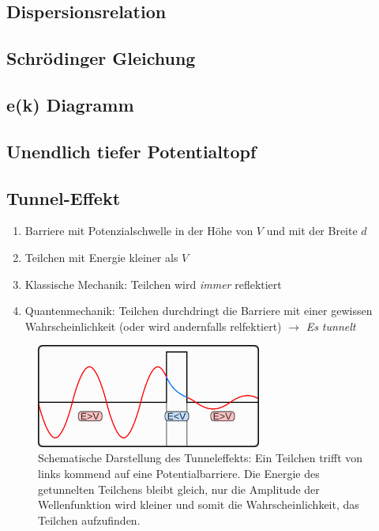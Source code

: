 \documentclass{article}
\begin{document}
\subsection{Dispersionsrelation }\label{k1:dispersionsrelation}



\subsection{Schrödinger Gleichung }\label{k1:schrGl}


\subsection{e(k) Diagramm }\label{k1:ekdiag}

\subsection{Unendlich tiefer Potentialtopf }\label{k1:pottopf}

\subsection{Tunnel-Effekt }\label{k1:tunnEf}
\begin{enumerate}
    \item Barriere mit Potenzialschwelle in der Höhe von $V$ und mit der Breite $d$
    \item Teilchen mit Energie kleiner als $V$
    \item Klassische Mechanik: Teilchen wird \textit{immer} reflektiert
    \item Quantenmechanik: Teilchen durchdringt die Barriere mit einer gewissen Wahrscheinlichkeit (oder wird andernfalls relfektiert) $\rightarrow$ \textit{Es tunnelt}
\end{enumerate}
\begin{figure}
    \centering
    \includegraphics[width=0.66\textwidth]{fig/tunneleffektwiki.png}
    \caption{Schematische Darstellung des Tunneleffekts:
Ein Teilchen trifft von links kommend auf eine Potentialbarriere. Die Energie des getunnelten Teilchens bleibt gleich, nur die Amplitude der Wellenfunktion wird kleiner und somit die Wahrscheinlichkeit, das Teilchen aufzufinden.}
    \label{fig:tunneleffekt}
\end{figure}
\end{document}
